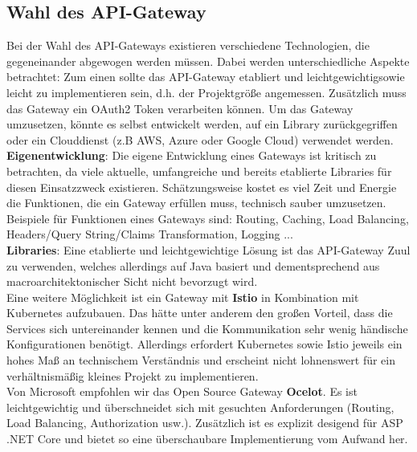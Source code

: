 {\subsection{Wahl des API-Gateway}

Bei der Wahl des API-Gateways existieren verschiedene Technologien, die gegeneinander abgewogen werden müssen. Dabei werden unterschiedliche Aspekte betrachtet: Zum einen sollte das API-Gateway etabliert und leichtgewichtigsowie leicht zu implementieren sein, d.h. der Projektgröße angemessen. Zusätzlich muss das Gateway ein OAuth2 Token verarbeiten können. Um das Gateway umzusetzen, könnte es selbst entwickelt werden, auf ein Library zurückgegriffen oder ein Clouddienst (z.B AWS, Azure oder Google Cloud) verwendet werden. \\

\textbf{Eigenentwicklung}: Die eigene Entwicklung eines Gateways ist kritisch zu betrachten, da viele aktuelle, umfangreiche und bereits etablierte Libraries für diesen Einsatzzweck existieren. Schätzungsweise kostet es viel Zeit und Energie die Funktionen, die ein Gateway erfüllen muss, technisch sauber umzusetzen. Beispiele für Funktionen eines Gateways sind: Routing, Caching, Load Balancing, Headers/Query String/Claims Transformation, Logging ...  \\

\textbf{Libraries}: Eine etablierte und leichtgewichtige Lösung ist das API-Gateway Zuul zu verwenden, welches allerdings auf Java basiert und dementsprechend aus macroarchitektonischer Sicht nicht bevorzugt wird. \\

Eine weitere Möglichkeit ist ein Gateway mit \textbf{Istio} in Kombination mit Kubernetes aufzubauen. Das hätte unter anderem den großen Vorteil, dass die Services sich untereinander kennen und die Kommunikation sehr wenig händische Konfigurationen benötigt. Allerdings erfordert Kubernetes sowie Istio jeweils ein hohes Maß an technischem Verständnis und erscheint nicht lohnenswert für ein verhältnismäßig kleines Projekt zu implementieren.\cite{HeiseIstio}\cite{istioQuickstart} \\    

Von Microsoft empfohlen wir das Open Source Gateway \textbf{Ocelot}. Es ist leichtgewichtig und überschneidet sich mit gesuchten Anforderungen (Routing, Load Balancing, Authorization usw.). Zusätzlich ist es explizit desigend für ASP .NET Core und bietet so eine überschaubare Implementierung vom Aufwand her.\cite{microsoftOcelot}\\

}

